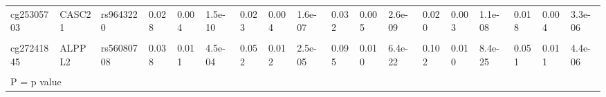 \documentclass[11pt,oneside]{bristolthesis}
\begin{document}
\begin{landscape}
\begin{table}[!h]
{\begin{tabular}[t]{llllllllllllllllll}
cg25305703 & CASC21 & rs9643220 & 0.028 & 0.004 & 1.5e-10 & 0.023 & 0.004 & 1.6e-07 & 0.032 & 0.005 & 2.6e-09 & 0.020 & 0.003 & 1.1e-08 & 0.018 & 0.004 & 3.3e-06\\
\cellcolor{gray!6}{cg26963277} & \cellcolor{gray!6}{KCNQ1} & \cellcolor{gray!6}{rs463924} & \cellcolor{gray!6}{-0.018} & \cellcolor{gray!6}{0.002} & \cellcolor{gray!6}{1.6e-14} & \cellcolor{gray!6}{-0.015} & \cellcolor{gray!6}{0.003} & \cellcolor{gray!6}{1.2e-08} & \cellcolor{gray!6}{-0.008} & \cellcolor{gray!6}{0.003} & \cellcolor{gray!6}{5.6e-03} & \cellcolor{gray!6}{-0.012} & \cellcolor{gray!6}{0.002} & \cellcolor{gray!6}{6.3e-09} & \cellcolor{gray!6}{-0.015} & \cellcolor{gray!6}{0.002} & \cellcolor{gray!6}{7.5e-12}\\
\addlinespace
cg27241845 & ALPPL2 & rs56080708 & 0.038 & 0.011 & 4.5e-04 & 0.052 & 0.012 & 2.5e-05 & 0.095 & 0.010 & 6.4e-22 & 0.102 & 0.010 & 8.4e-25 & 0.051 & 0.011 & 4.4e-06\\
\bottomrule
\multicolumn{18}{l}{\textsuperscript{} P = p value}\\
\end{tabular}}
\end{table}
\end{landscape}
\end{document}
